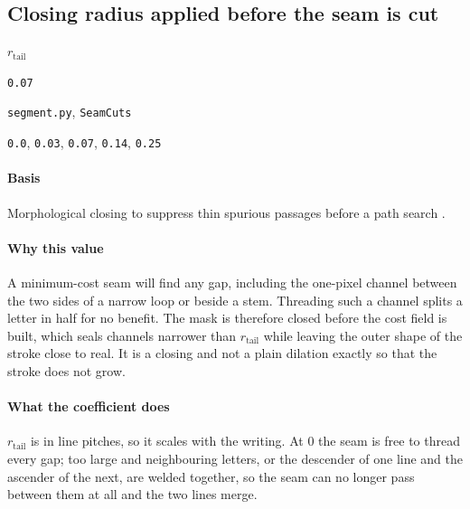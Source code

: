 \subsection{Closing radius applied before the seam is cut}

\label{coef:seam-tail-radius}

\begin{description}[leftmargin=5.2em,style=sameline]

\item[Symbol] $r_{\text{tail}}$

\item[Value] \texttt{0.07}

\item[Source] \texttt{segment.py}, \texttt{SeamCuts}

\item[Swept] \texttt{0.0}, \texttt{0.03}, \texttt{0.07}, \texttt{0.14}, \texttt{0.25}

\end{description}

\paragraph{Basis}

Morphological closing to suppress thin spurious passages before a path search \cite{haralick1987}.

\paragraph{Why this value}

A minimum-cost seam will find any gap, including the one-pixel channel between the two sides of a narrow loop or beside a stem. Threading such a channel splits a letter in half for no benefit. The mask is therefore closed before the cost field is built, which seals channels narrower than $r_{\text{tail}}$ while leaving the outer shape of the stroke close to real. It is a closing and not a plain dilation exactly so that the stroke does not grow.

\paragraph{What the coefficient does}

$r_{\text{tail}}$ is in line pitches, so it scales with the writing. At $0$ the seam is free to thread every gap; too large and neighbouring letters, or the descender of one line and the ascender of the next, are welded together, so the seam can no longer pass between them at all and the two lines merge.

